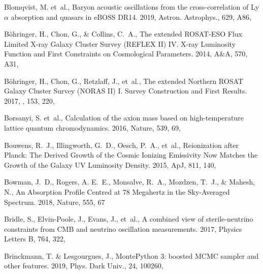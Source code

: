 \documentclass[longauth,traditabstract]{aa}
\def\aap{{A\&A}}
\def\apj{{ApJ}}
\begin{document}
\begin{thebibliography}{379}
Blomqvist, M. {et~al.}, {Baryon acoustic oscillations from the
  cross-correlation of Ly$\alpha$ absorption and quasars in eBOSS DR14}. 2019,
  Astron. Astrophys., 629, A86, 

B{\"o}hringer, H., Chon, G., \& Collins, C.~A., {The extended ROSAT-ESO Flux
  Limited X-ray Galaxy Cluster Survey (REFLEX II) IV. X-ray Luminosity Function
  and First Constraints on Cosmological Parameters}. 2014, \aap, 570, A31,

B{\"o}hringer, H., Chon, G., Retzlaff, J., {et~al.}, {The extended Northern
  ROSAT Galaxy Cluster Survey (NORAS II) I. Survey Construction and First
  Results}. 2017, \aj, 153, 220, 

Borsanyi, S. {et~al.}, {Calculation of the axion mass based on high-temperature
  lattice quantum chromodynamics}. 2016, Nature, 539, 69, 

Bouwens, R.~J., Illingworth, G.~D., Oesch, P.~A., {et~al.}, Reionization after
  {{Planck}}: {{The Derived Growth}} of the {{Cosmic Ionizing Emissivity}} Now
  Matches the {{Growth}} of the {{Galaxy UV Luminosity Density}}. 2015, \apj,
  811, 140, 

Bowman, J.~D., Rogers, A. E.~E., Monsalve, R.~A., Mozdzen, T.~J., \& Mahesh,
  N., An Absorption Profile Centred at 78 Megahertz in the Sky-Averaged
  Spectrum. 2018, Nature, 555, 67

{Bridle}, S., {Elvin-Poole}, J., {Evans}, J., {et~al.}, {A combined view of
  sterile-neutrino constraints from CMB and neutrino oscillation measurements}.
  2017, Physics Letters B, 764, 322, 

Brinckmann, T. \& Lesgourgues, J., {MontePython 3: boosted MCMC sampler and
  other features}. 2019, Phys. Dark Univ., 24, 100260, 


\end{thebibliography}
\end{document}
